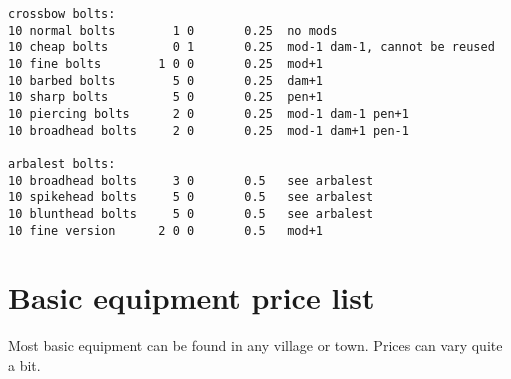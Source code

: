 \begin{verbatim}
crossbow bolts:
10 normal bolts        1 0       0.25  no mods
10 cheap bolts         0 1       0.25  mod-1 dam-1, cannot be reused
10 fine bolts        1 0 0       0.25  mod+1
10 barbed bolts        5 0       0.25  dam+1
10 sharp bolts         5 0       0.25  pen+1
10 piercing bolts      2 0       0.25  mod-1 dam-1 pen+1
10 broadhead bolts     2 0       0.25  mod-1 dam+1 pen-1

arbalest bolts:
10 broadhead bolts     3 0       0.5   see arbalest
10 spikehead bolts     5 0       0.5   see arbalest
10 blunthead bolts     5 0       0.5   see arbalest
10 fine version      2 0 0       0.5   mod+1
\end{verbatim} \normalsize








\section*{Basic equipment price list}
\label{sec:basicequipmentpricelist}

Most basic equipment can be found in any village or town. Prices can vary quite a bit.


